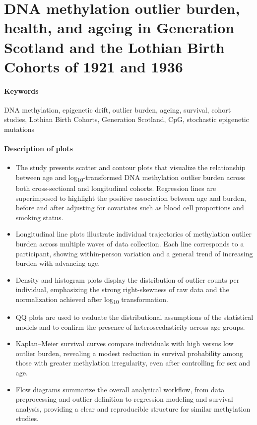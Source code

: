 \documentclass[10pt]{extarticle}
\begin{document}
\section{DNA methylation outlier burden, health, and ageing in Generation Scotland and the Lothian Birth Cohorts of 1921 and 1936}

\paragraph{Keywords}
DNA methylation, epigenetic drift, outlier burden, ageing, survival, cohort studies, Lothian Birth Cohorts, Generation Scotland, CpG, stochastic epigenetic mutations \cite{seeboth2020outlierburden}

\paragraph{Description of plots}
\begin{itemize}[label=-]
  \item The study presents scatter and contour plots that visualize the relationship between age and log\textsubscript{10}-transformed DNA methylation outlier burden across both cross-sectional and longitudinal cohorts. Regression lines are superimposed to highlight the positive association between age and burden, before and after adjusting for covariates such as blood cell proportions and smoking status.  
  \item Longitudinal line plots illustrate individual trajectories of methylation outlier burden across multiple waves of data collection. Each line corresponds to a participant, showing within-person variation and a general trend of increasing burden with advancing age.  
  \item Density and histogram plots display the distribution of outlier counts per individual, emphasizing the strong right-skewness of raw data and the normalization achieved after log\textsubscript{10} transformation.  
  \item QQ plots are used to evaluate the distributional assumptions of the statistical models and to confirm the presence of heteroscedasticity across age groups.  
  \item Kaplan–Meier survival curves compare individuals with high versus low outlier burden, revealing a modest reduction in survival probability among those with greater methylation irregularity, even after controlling for sex and age.  
  \item Flow diagrams summarize the overall analytical workflow, from data preprocessing and outlier definition to regression modeling and survival analysis, providing a clear and reproducible structure for similar methylation studies.  
\end{itemize}
\end{document}
